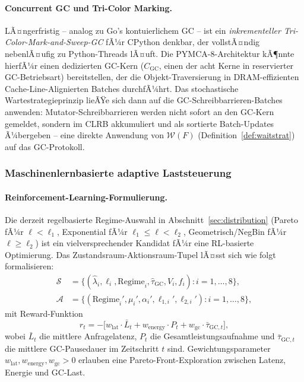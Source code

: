 ﻿\documentclass[a4paper,12pt]{scrreprt}
\theoremstyle{definition}
\begin{document}
	\paragraph{Concurrent GC und Tri-Color Marking.}
	LÃ¤ngerfristig -- analog zu Go's kontuierlichem GC -- ist ein
	\emph{inkrementeller Tri-Color-Mark-and-Sweep-GC} fÃ¼r CPython denkbar,
	der vollstÃ¤ndig nebenlÃ¤ufig zu Python-Threads lÃ¤uft. Die PYMCA-8-Architektur
	kÃ¶nnte hierfÃ¼r einen dedizierten GC-Kern ($C_{\mathrm{GC}}$, einen der acht
	Kerne in reservierter GC-Betriebsart) bereitstellen, der die Objekt-Traversierung
	in DRAM-effizienten Cache-Line-Alignierten Batches durchfÃ¼hrt. Das
	stochastische Wartestrategieprinzip lieÃŸe sich dann auf die
	GC-Schreibbarrieren-Batches anwenden: Mutator-Schreibbarrieren werden
	nicht sofort an den GC-Kern gemeldet, sondern im CLRB akkumuliert und
	als sortierte Batch-Updates Ã¼bergeben -- eine direkte Anwendung von
	$\mathcal{W}(F)$ (Definition~\ref{def:waitstrat}) auf das GC-Protokoll.

	\subsubsection{Maschinenlernbasierte adaptive Laststeuerung}

	\paragraph{Reinforcement-Learning-Formulierung.}
	Die derzeit regelbasierte Regime-Auswahl in Abschnitt~\ref{sec:distribution}
	(Pareto fÃ¼r $\ell < \ell_1$, Exponential fÃ¼r $\ell_1 \le \ell < \ell_2$,
	Geometrisch/NegBin fÃ¼r $\ell \ge \ell_2$) ist ein vielversprechender Kandidat
	fÃ¼r eine RL-basierte Optimierung. Das Zustandsraum-Aktionsraum-Tupel lÃ¤sst sich
	wie folgt formalisieren:
	\begin{align}
		\mathcal{S} &= \bigl\{ (\hat\lambda_i, \ell_i, \mathrm{Regime}_i,
		\hat\tau_{\mathrm{GC}}, V_i, f_i) : i = 1,\ldots,8 \bigr\}, \\
		\mathcal{A} &= \bigl\{ (\mathrm{Regime}_i', \mu_i', \alpha_i',
		\ell_{1,i}', \ell_{2,i}') : i = 1,\ldots,8 \bigr\},
	\end{align}
	mit Reward-Funktion
	\begin{equation}
		r_t = -\bigl[ w_{\mathrm{lat}} \cdot \bar{L}_t
		+ w_{\mathrm{energy}} \cdot P_t
		+ w_{\mathrm{gc}} \cdot \bar\tau_{\mathrm{GC},t} \bigr],
		\label{eq:rl_reward}
	\end{equation}
	wobei $\bar{L}_t$ die mittlere Anfragelatenz, $P_t$ die Gesamtleistungsaufnahme
	und $\bar\tau_{\mathrm{GC},t}$ die mittlere GC-Pausedauer im Zeitschritt $t$ sind.
	Gewichtungsparameter $w_{\mathrm{lat}}, w_{\mathrm{energy}}, w_{\mathrm{gc}} > 0$
	erlauben eine Pareto-Front-Exploration zwischen Latenz, Energie und GC-Last.
\end{document}
